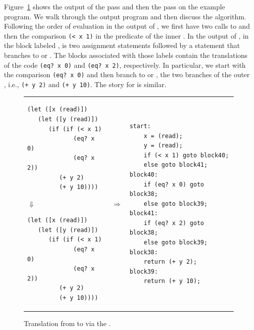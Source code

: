 \documentclass[11pt]{book}
\begin{document}
Figure~\ref{fig:explicate-control-s1-38} shows the output of the
 pass and then the
 pass on the example program. We walk through
the output program and then discuss the algorithm.
%
Following the order of evaluation in the output of
, we first have two calls to 
and then the comparison \lstinline{(< x 1)} in the predicate of the
inner .  In the output of , in the
block labeled , is two assignment statements followed by a
 statement that branches to  or
. The blocks associated with those labels contain the
translations of the code \lstinline{(eq? x 0)} and \lstinline{(eq? x 2)},
respectively.  In particular, we start  with the
comparison \lstinline{(eq? x 0)} and then branch to  or
, the two branches of the outer , i.e.,
\lstinline{(+ y 2)} and \lstinline{(+ y 10)}. The story for
 is similar.

\begin{figure}[tbp]
\begin{tabular}{lll}
\begin{minipage}{0.4\textwidth}
\begin{lstlisting}
(let ([x (read)])
   (let ([y (read)])
      (if (if (< x 1)
             (eq? x 0)
             (eq? x 2))
         (+ y 2)
         (+ y 10))))
\end{lstlisting}
\hspace{40pt}$\Downarrow$
\begin{lstlisting}
(let ([x (read)])
   (let ([y (read)])
      (if (if (< x 1)
             (eq? x 0)
             (eq? x 2))
         (+ y 2)
         (+ y 10))))
\end{lstlisting}
\end{minipage}
&
$\Rightarrow$
&
\begin{minipage}{0.55\textwidth}
\begin{lstlisting}
start:
    x = (read);
    y = (read);
    if (< x 1) goto block40;
    else goto block41;
block40:
    if (eq? x 0) goto block38;
    else goto block39;
block41:
    if (eq? x 2) goto block38;
    else goto block39;
block38:
    return (+ y 2);
block39:
    return (+ y 10);
\end{lstlisting}
\end{minipage}
\end{tabular} 

\caption{Translation from \LangIf{} to \LangCIf{}
  via the .}
\label{fig:explicate-control-s1-38}
\end{figure}
\end{document}

